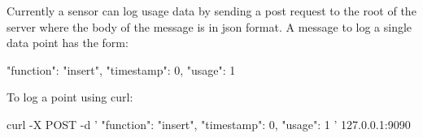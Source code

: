 Currently a sensor can log usage data by sending a post request to the root of the server where the body of the message is in json format. A message to log a single data point has the form\-: \begin{DoxyVerb}{
    "function": "insert",
    "timestamp": 0,
    "usage": 1
}
\end{DoxyVerb}


To log a point using curl\-: \begin{DoxyVerb}curl -X POST -d '{ "function": "insert", "timestamp": 0, "usage": 1 }' 127.0.0.1:9090\end{DoxyVerb}
 